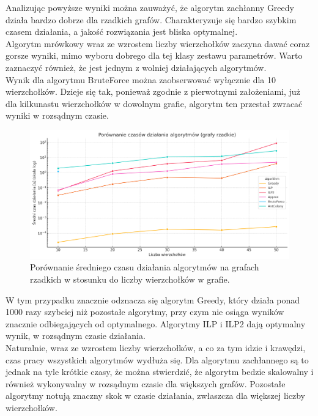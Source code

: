     Analizując powyższe wyniki można zauważyć, że algorytm zachłanny Greedy działa bardzo dobrze dla rzadkich grafów. Charakteryzuje się bardzo szybkim czasem działania, a jakość rozwiązania jest bliska optymalnej.\\
    Algorytm mrówkowy wraz ze wzrostem liczby wierzchołków zaczyna dawać coraz gorsze wyniki, mimo wyboru dobrego dla tej klasy zestawu parametrów. Warto zaznaczyć również, że jest jednym z wolniej działających algorytmów.\\
    Wynik dla algorytmu BruteForce można zaobserwować wyłącznie dla 10 wierzchołków. Dzieje się tak, ponieważ zgodnie z pierwotnymi założeniami, już dla kilkunastu wierzchołków w dowolnym grafie, algorytm ten przestał zwracać wyniki w rozsądnym czasie.

    \begin{figure}[H]
        \centering
        \includegraphics[width=\textwidth]{assets/sparse.png}
        \caption{Porównanie średniego czasu działania algorytmów na grafach rzadkich w stosunku do liczby wierzchołków w grafie.}
        \label{fig:sparsePlot}
    \end{figure}

    W tym przypadku znacznie odznacza się algorytm Greedy, który działa ponad 1000 razy szybciej niż pozostałe algorytmy, przy czym nie osiąga wyników znacznie odbiegających od optymalnego. Algorytmy ILP i ILP2 dają optymalny wynik, w rozsądnym czasie działania.\\
    Naturalnie, wraz ze wzrostem liczby wierzchołków, a co za tym idzie i krawędzi, czas pracy wszystkich algorytmów wydłuża się. Dla algorytmu zachłannego są to jednak na tyle krótkie czasy, że można stwierdzić, że algorytm bedzie skalowalny i również wykonywalny w rozsądnym czasie dla większych grafów. Pozostałe algorytmy notują znaczny skok w czasie działania, zwłaszcza dla większej liczby wierzchołków.


